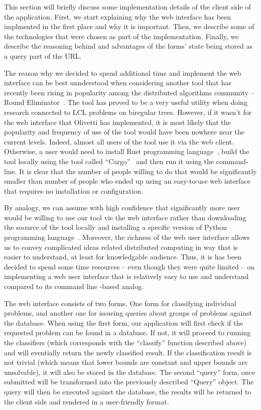 This section will briefly discuss some implementation details of
the client side of the application. First, we start explaining why
the web interface has been implmented in the first place and why it
is important. Then, we describe some of the technologies that were
chosen as part of the implementation. Finally, we describe the
reasoning behind and advantages of the forms' state being stored
as a query part of the URL.

The reason why we decided to spend additional time and implement
the web interface can be best unnderstood when considering
another tool that has recently been rising in popularity among
the distributed algorithms community -- Round Eliminator~\cite{Olivetti2020}. The tool has proved to be a very useful utility
when doing research connected to LCL problems on biregular trees.
However, if it wasn't for the web interface that Olivetti has
implemented, it is most likely that the popularity and
frequency of use of the tool would have been nowhere near the current
levels. Indeed, almost all users of the tool use it via the web
client. Otherwise, a user would need to install Rust programming
language~\cite{Rust}, build the tool locally using the tool
called ``Cargo''~\cite{Cargo} and then run it using the command-line.
It is clear that the number of people willing to do that would be
significantly smaller than number of people who ended up using
an easy-to-use web interface that requires no installation or 
configuration.

By analogy, we can assume with high confidence that significantly more
user would be willing to use our tool vie the web interface rather
than downloading the soource of the tool locally and installing
a specific version of Python programming language~\cite{CPython}.
Moreover, the richness of the web user interface allows us to convey complicated
ideas related distributed computing in way that is easier to understand, at least for knowledgable audience. Thus, it is has been
decided to spend some time resources -- even though they were 
quite limited -- on implementing a web user interface that is
relatively easy to use and understand compared to its
command line -based analog.

The web interface consists of two forms. One form for classifying
individual problems, and another one for issueing queries
about groups of problems against the database. When using the
first form, our application will first check if the requested
problem can be found in a database. If not, it will proceed to
running the classifiers (which corresponds with the ``classify'' function described above) and will eventially return the newly
classified result. If the classification result is not trivial (which means that lower bounds are constant and upper bounds are unsolvable),
it will also be stored in the database. The second ``query'' form, once
submitted will be transformed into the previously described
``Query'' object. The query will then be executed against the database,
the results will be returned to the client side and rendered
in a user-friendly format.

